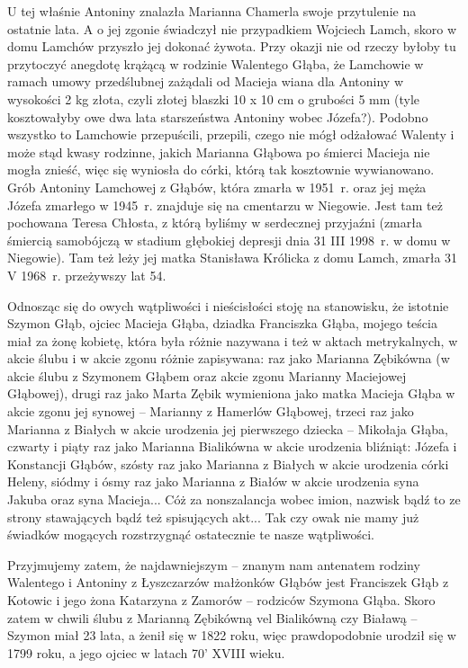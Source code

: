 
U tej właśnie Antoniny znalazła Marianna Chamerla swoje przytulenie na ostatnie lata. A o jej zgonie świadczył nie przypadkiem Wojciech Lamch, skoro w domu Lamchów przyszło jej dokonać żywota. 
Przy okazji nie od rzeczy byłoby tu przytoczyć anegdotę krążącą w rodzinie Walentego Głąba, że Lamchowie w ramach umowy przedślubnej zażądali od Macieja wiana dla Antoniny w wysokości 2 kg złota, czyli złotej blaszki 10 x 10 cm o grubości 5 mm (tyle kosztowałyby owe dwa lata starszeństwa Antoniny wobec Józefa?).  Podobno wszystko to Lamchowie przepuścili, przepili, czego nie mógł odżałować Walenty i może stąd kwasy rodzinne, jakich Marianna Głąbowa po śmierci Macieja nie mogła znieść, więc się wyniosła do córki, którą tak kosztownie wywianowano. Grób Antoniny Lamchowej z Głąbów, która zmarła w 1951~r. oraz jej męża Józefa zmarłego w 1945~r. znajduje się na cmentarzu w Niegowie. Jest tam też pochowana Teresa Chłosta, z którą byliśmy w serdecznej przyjaźni (zmarła śmiercią samobójczą w stadium głębokiej depresji dnia 31 III 1998~r. w domu w Niegowie). Tam też leży jej matka Stanisława Królicka z domu Lamch, zmarła 31 V 1968~r. przeżywszy lat 54.

Odnosząc się do owych wątpliwości i nieścisłości stoję na stanowisku, że istotnie Szymon Głąb, ojciec Macieja Głąba, dziadka Franciszka Głąba, mojego teścia miał za żonę kobietę, która była różnie nazywana i też w  aktach metrykalnych, w akcie ślubu i w akcie zgonu różnie zapisywana: raz jako Marianna Zębikówna (w akcie ślubu z Szymonem Głąbem oraz akcie zgonu Marianny Maciejowej Głąbowej), drugi raz jako Marta Zębik wymieniona jako matka Macieja Głąba w akcie zgonu jej synowej – Marianny z Hamerlów Głąbowej, trzeci raz jako Marianna z Białych w akcie urodzenia jej pierwszego dziecka – Mikołaja Głąba, czwarty i piąty raz jako Marianna Bialikówna w akcie urodzenia bliźniąt: Józefa i Konstancji Głąbów, szósty raz jako Marianna z Białych w akcie urodzenia córki Heleny, siódmy i ósmy raz jako Marianna z Białów w akcie urodzenia syna Jakuba oraz syna Macieja... Cóż za nonszalancja wobec imion, nazwisk bądź to ze strony stawających bądź też spisujących akt... Tak czy owak nie mamy już świadków mogących rozstrzygnąć ostatecznie te nasze wątpliwości.

Przyjmujemy zatem, że najdawniejszym -- znanym nam antenatem rodziny Walentego i Antoniny z Łyszczarzów małżonków Głąbów jest Franciszek Głąb z Kotowic i jego żona Katarzyna z Zamorów -- rodziców Szymona Głąba. Skoro zatem w chwili ślubu z Marianną Zębikówną vel Bialikówną czy Białawą -- Szymon miał 23 lata, a żenił się w 1822 roku, więc prawdopodobnie urodził się w 1799 roku, a jego ojciec w latach 70’ XVIII wieku.

